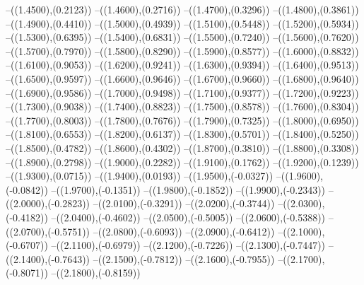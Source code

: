{	--({\sx*(1.4500)},{\sy*(0.2123)})
	--({\sx*(1.4600)},{\sy*(0.2716)})
	--({\sx*(1.4700)},{\sy*(0.3296)})
	--({\sx*(1.4800)},{\sy*(0.3861)})
	--({\sx*(1.4900)},{\sy*(0.4410)})
	--({\sx*(1.5000)},{\sy*(0.4939)})
	--({\sx*(1.5100)},{\sy*(0.5448)})
	--({\sx*(1.5200)},{\sy*(0.5934)})
	--({\sx*(1.5300)},{\sy*(0.6395)})
	--({\sx*(1.5400)},{\sy*(0.6831)})
	--({\sx*(1.5500)},{\sy*(0.7240)})
	--({\sx*(1.5600)},{\sy*(0.7620)})
	--({\sx*(1.5700)},{\sy*(0.7970)})
	--({\sx*(1.5800)},{\sy*(0.8290)})
	--({\sx*(1.5900)},{\sy*(0.8577)})
	--({\sx*(1.6000)},{\sy*(0.8832)})
	--({\sx*(1.6100)},{\sy*(0.9053)})
	--({\sx*(1.6200)},{\sy*(0.9241)})
	--({\sx*(1.6300)},{\sy*(0.9394)})
	--({\sx*(1.6400)},{\sy*(0.9513)})
	--({\sx*(1.6500)},{\sy*(0.9597)})
	--({\sx*(1.6600)},{\sy*(0.9646)})
	--({\sx*(1.6700)},{\sy*(0.9660)})
	--({\sx*(1.6800)},{\sy*(0.9640)})
	--({\sx*(1.6900)},{\sy*(0.9586)})
	--({\sx*(1.7000)},{\sy*(0.9498)})
	--({\sx*(1.7100)},{\sy*(0.9377)})
	--({\sx*(1.7200)},{\sy*(0.9223)})
	--({\sx*(1.7300)},{\sy*(0.9038)})
	--({\sx*(1.7400)},{\sy*(0.8823)})
	--({\sx*(1.7500)},{\sy*(0.8578)})
	--({\sx*(1.7600)},{\sy*(0.8304)})
	--({\sx*(1.7700)},{\sy*(0.8003)})
	--({\sx*(1.7800)},{\sy*(0.7676)})
	--({\sx*(1.7900)},{\sy*(0.7325)})
	--({\sx*(1.8000)},{\sy*(0.6950)})
	--({\sx*(1.8100)},{\sy*(0.6553)})
	--({\sx*(1.8200)},{\sy*(0.6137)})
	--({\sx*(1.8300)},{\sy*(0.5701)})
	--({\sx*(1.8400)},{\sy*(0.5250)})
	--({\sx*(1.8500)},{\sy*(0.4782)})
	--({\sx*(1.8600)},{\sy*(0.4302)})
	--({\sx*(1.8700)},{\sy*(0.3810)})
	--({\sx*(1.8800)},{\sy*(0.3308)})
	--({\sx*(1.8900)},{\sy*(0.2798)})
	--({\sx*(1.9000)},{\sy*(0.2282)})
	--({\sx*(1.9100)},{\sy*(0.1762)})
	--({\sx*(1.9200)},{\sy*(0.1239)})
	--({\sx*(1.9300)},{\sy*(0.0715)})
	--({\sx*(1.9400)},{\sy*(0.0193)})
	--({\sx*(1.9500)},{\sy*(-0.0327)})
	--({\sx*(1.9600)},{\sy*(-0.0842)})
	--({\sx*(1.9700)},{\sy*(-0.1351)})
	--({\sx*(1.9800)},{\sy*(-0.1852)})
	--({\sx*(1.9900)},{\sy*(-0.2343)})
	--({\sx*(2.0000)},{\sy*(-0.2823)})
	--({\sx*(2.0100)},{\sy*(-0.3291)})
	--({\sx*(2.0200)},{\sy*(-0.3744)})
	--({\sx*(2.0300)},{\sy*(-0.4182)})
	--({\sx*(2.0400)},{\sy*(-0.4602)})
	--({\sx*(2.0500)},{\sy*(-0.5005)})
	--({\sx*(2.0600)},{\sy*(-0.5388)})
	--({\sx*(2.0700)},{\sy*(-0.5751)})
	--({\sx*(2.0800)},{\sy*(-0.6093)})
	--({\sx*(2.0900)},{\sy*(-0.6412)})
	--({\sx*(2.1000)},{\sy*(-0.6707)})
	--({\sx*(2.1100)},{\sy*(-0.6979)})
	--({\sx*(2.1200)},{\sy*(-0.7226)})
	--({\sx*(2.1300)},{\sy*(-0.7447)})
	--({\sx*(2.1400)},{\sy*(-0.7643)})
	--({\sx*(2.1500)},{\sy*(-0.7812)})
	--({\sx*(2.1600)},{\sy*(-0.7955)})
	--({\sx*(2.1700)},{\sy*(-0.8071)})
	--({\sx*(2.1800)},{\sy*(-0.8159)})
}
